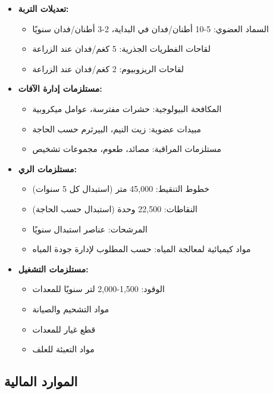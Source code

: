 \begin{itemize}
    \item \textbf{تعديلات التربة:}
    \begin{itemize}
        \item السماد العضوي: 5-10 أطنان/فدان في البداية، 2-3 أطنان/فدان سنويًا
        \item لقاحات الفطريات الجذرية: 5 كغم/فدان عند الزراعة
        \item لقاحات الريزوبيوم: 2 كغم/فدان عند الزراعة
    \end{itemize}
    \item \textbf{مستلزمات إدارة الآفات:}
    \begin{itemize}
        \item المكافحة البيولوجية: حشرات مفترسة، عوامل ميكروبية
        \item مبيدات عضوية: زيت النيم، البيرثرم حسب الحاجة
        \item مستلزمات المراقبة: مصائد، طعوم، مجموعات تشخيص
    \end{itemize}
    \item \textbf{مستلزمات الري:}
    \begin{itemize}
        \item خطوط التنقيط: 45,000 متر (استبدال كل 5 سنوات)
        \item النقاطات: 22,500 وحدة (استبدال حسب الحاجة)
        \item المرشحات: عناصر استبدال سنويًا
        \item مواد كيميائية لمعالجة المياه: حسب المطلوب لإدارة جودة المياه
    \end{itemize}
    \item \textbf{مستلزمات التشغيل:}
    \begin{itemize}
        \item الوقود: 1,500-2,000 لتر سنويًا للمعدات
        \item مواد التشحيم والصيانة
        \item قطع غيار للمعدات
        \item مواد التعبئة للعلف
    \end{itemize}
\end{itemize}

\subsection{الموارد المالية}

